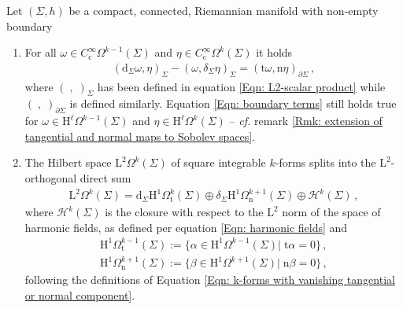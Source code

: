 \begin{theorem}\label{Thm: Hodge decomposition for manifolds with boundary}
	Let $(\Sigma,h)$ be a compact, connected, Riemannian manifold with non-empty boundary %
	\begin{enumerate}
		\item
		For all $\omega\in C^{\infty}_{\mathrm{c}}\Omega^{k-1}(\Sigma)$ and $\eta\in C^{\infty}_\mathrm{c}\Omega^{k}(\Sigma)$ it holds
		\begin{align}\label{Eqn: boundary terms}
			(\mathrm{d}_\Sigma\omega,\eta)_\Sigma-(\omega,\delta_\Sigma\eta)_\Sigma=
			(\mathrm{t}\omega,\mathrm{n}\eta)_{\partial\Sigma}\,,
		\end{align}
		where $(\;,\;)_\Sigma$ has been defined in equation \eqref{Eqn: L2-scalar product} while $(\;,\;)_{\partial\Sigma}$ is defined similarly.
		Equation \eqref{Eqn: boundary terms} still holds true for $\omega\in \mathrm{H}^\ell\Omega^{k-1}(\Sigma)$ and $\eta\in \mathrm{H}^\ell\Omega^{k}(\Sigma)$ -- \textit{cf.} remark \ref{Rmk: extension of tangential and normal maps to Sobolev spaces}.
		\item
		The Hilbert space $\mathrm{L}^2\Omega^k(\Sigma)$ of square integrable $k$-forms splits into the $\mathrm{L}^2$-orthogonal direct sum
		\begin{align}\label{Eqn: Hodge decomposition for manifold with boundary}
			\mathrm{L}^2\Omega^k(\Sigma)=
			\mathrm{d}_\Sigma \mathrm{H}^1\Omega^k_{\mathrm{t}}(\Sigma)\oplus
			\delta_\Sigma \mathrm{H}^1\Omega^{k+1}_{\mathrm{n}}(\Sigma)
			\oplus\mathcal{H}^k(\Sigma)\,,		
		\end{align}
		where $\mathcal{H}^k(\Sigma)$ is the closure with respect to the $\mathrm{L}^2$ norm of the space of harmonic fields, as defined per equation \eqref{Eqn: harmonic fields} and
		\begin{align}\label{Eqn: Dirichlet and Neumann forms}
			\mathrm{H}^1\Omega^{k-1}_{\mathrm{t}}(\Sigma):=\lbrace\alpha\in \mathrm{H}^1\Omega^{k-1}(\Sigma)|\;\mathrm{t}\alpha=0\rbrace\,,\\
			\mathrm{H}^1\Omega^{k+1}_{\mathrm{n}}(\Sigma):=\lbrace\beta\in \mathrm{H}^1\Omega^{k+1}(\Sigma)|\;\mathrm{n}\beta=0\rbrace\,,
		\end{align}
	following the definitions of Equation \eqref{Eqn: k-forms with vanishing tangential or normal component}.
	\end{enumerate}
\end{theorem}
